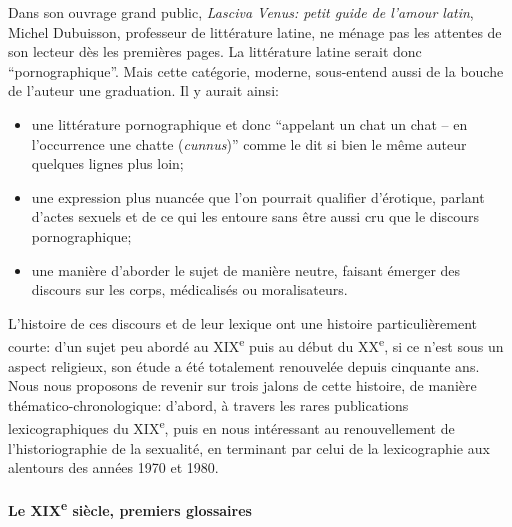 Dans son ouvrage grand public, \textit{Lasciva Venus: petit guide de l'amour latin}, Michel Dubuisson, professeur de littérature latine, ne ménage pas les attentes de son lecteur dès les premières pages. La littérature latine serait donc \enquote{pornographique}. Mais cette catégorie, moderne, sous-entend aussi de la bouche de l'auteur une graduation. Il y aurait ainsi:
\begin{itemize}
    \item une littérature pornographique et donc \enquote{appelant un chat un chat -- en l'occurrence une chatte (\textit{cunnus})} comme le dit si bien le même auteur quelques lignes plus loin;
    \item une expression plus nuancée que l'on pourrait qualifier d'érotique, parlant d'actes sexuels et de ce qui les entoure sans être aussi cru que le discours pornographique;
    \item une manière d'aborder le sujet de manière neutre, faisant émerger des discours sur les corps, médicalisés ou moralisateurs.
\end{itemize}

L'histoire de ces discours et de leur lexique ont une histoire particulièrement courte: d'un sujet peu abordé au XIX\textsuperscript{e} puis au début du XX\textsuperscript{e}, si ce n'est sous un aspect religieux, son étude a été totalement renouvelée depuis cinquante ans. Nous nous proposons de revenir sur trois jalons de cette histoire, de manière thématico-chronologique: d'abord, à travers les rares publications lexicographiques du XIX\textsuperscript{e}, puis en nous intéressant au renouvellement de l'historiographie de la sexualité, en terminant par celui de la lexicographie aux alentours des années 1970 et 1980.

\paragraph{Le XIX\textsuperscript{e} siècle, premiers glossaires}

